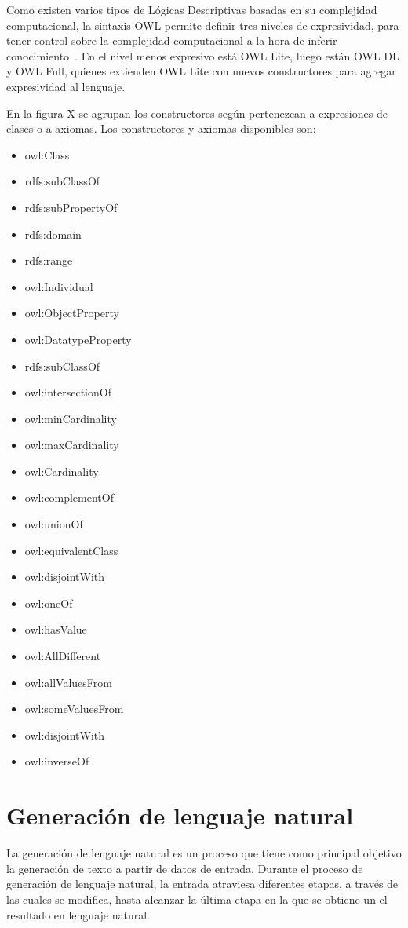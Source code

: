 Como existen varios tipos de Lógicas Descriptivas basadas en su complejidad computacional, la sintaxis OWL permite definir tres niveles de expresividad, para tener control sobre la complejidad computacional a la hora de inferir conocimiento~\cite{tello2001ontologias}. En el nivel menos expresivo está OWL Lite, luego están OWL DL y OWL Full, quienes extienden OWL Lite con nuevos constructores para agregar expresividad al lenguaje.

En la figura X se agrupan los constructores según pertenezcan a expresiones de clases o a axiomas.
Los constructores y axiomas disponibles son: 
\begin{multicols}{3}
\begin{itemize}
    \item owl:Class
    \item rdfs:subClassOf
    \item rdfs:subPropertyOf
    \item rdfs:domain
    \item rdfs:range
    \item owl:Individual 
    \item owl:ObjectProperty
    \item owl:DatatypeProperty
    \item rdfs:subClassOf
    \item owl:intersectionOf
    \item owl:minCardinality
    \item owl:maxCardinality
    \item owl:Cardinality
    \item owl:complementOf
    \item owl:unionOf
    \item owl:equivalentClass
    \item owl:disjointWith
    \item owl:oneOf
    \item owl:hasValue
    \item owl:AllDifferent
    \item owl:allValuesFrom
    \item owl:someValuesFrom 
    \item owl:disjointWith
    \item owl:inverseOf
\end{itemize}
\end{multicols}

 
\section{Generación de lenguaje natural}
\label{sec:tareas_gnl}
La generación de lenguaje natural es un proceso que tiene como principal objetivo la generación de texto a partir de datos de entrada.
Durante el proceso de generación de lenguaje natural, la entrada atraviesa diferentes etapas, a través de las cuales se modifica, hasta alcanzar la última etapa en la que se obtiene un el resultado en lenguaje natural.

